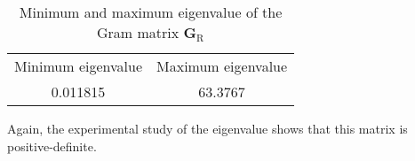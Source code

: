 \begin{table} 
    \begin{tabular}{ c c  }
        Minimum eigenvalue & Maximum eigenvalue \\
        0.011815 & 63.3767 \\ 
    \end{tabular} 
    \caption{Minimum and maximum eigenvalue of the Gram matrix $\boldsymbol{G}_{\mathrm{R}}$} 
\end{table}

Again, the experimental study of the eigenvalue shows that this matrix is positive-definite.